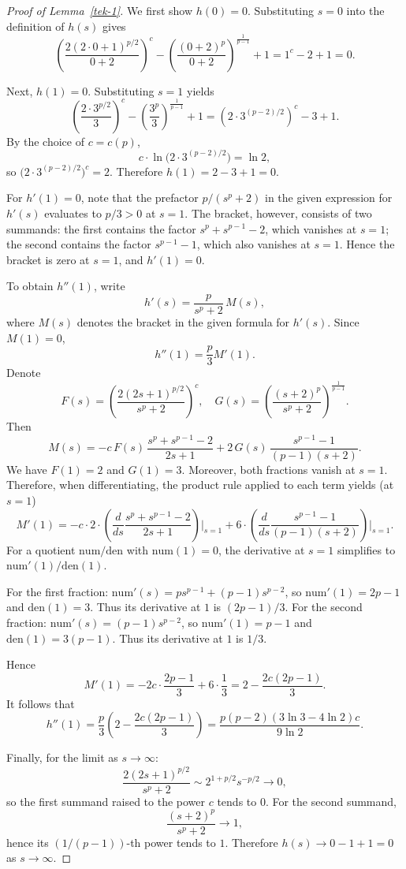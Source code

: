 \documentclass[11pt]{article}
\theoremstyle{definition}
\newcommand{\1}{\mathbf{1}}
\begin{document}
\begin{proof}[Proof of Lemma~\ref{tek-1}]
We first show $h(0)=0$. Substituting $s=0$ into the definition of $h(s)$ gives
\[
\left( \frac{2(2\cdot0+1)^{p/2}}{0+2} \right)^c - \left( \frac{(0+2)^p}{0+2} \right)^{\frac{1}{p-1}} + 1 = 1^c - 2 + 1 = 0.
\]

Next, $h(1)=0$. Substituting $s=1$ yields
\[
\left( \frac{2\cdot3^{p/2}}{3} \right)^c - \left( \frac{3^p}{3} \right)^{\frac{1}{p-1}} + 1 = \left(2 \cdot 3^{(p-2)/2}\right)^c - 3 + 1.
\]
By the choice of $c=c(p)$,
\[
c \cdot \ln\bigl(2 \cdot 3^{(p-2)/2}\bigr) = \ln 2,
\]
so $\bigl(2 \cdot 3^{(p-2)/2}\bigr)^c = 2$. Therefore $h(1) = 2 - 3 + 1 = 0$.

For $h'(1)=0$, note that the prefactor $p/(s^p + 2)$ in the given expression for $h'(s)$ evaluates to $p/3 > 0$ at $s=1$. The bracket, however, consists of two summands: the first contains the factor $s^p + s^{p-1} - 2$, which vanishes at $s=1$; the second contains the factor $s^{p-1} - 1$, which also vanishes at $s=1$. Hence the bracket is zero at $s=1$, and $h'(1)=0$.

To obtain $h''(1)$, write
\[
h'(s) = \frac{p}{s^p + 2} \, M(s),
\]
where $M(s)$ denotes the bracket in the given formula for $h'(s)$. Since $M(1)=0$,
\[
h''(1) = \frac{p}{3} M'(1).
\]
Denote
\[
F(s) = \left( \frac{2(2s+1)^{p/2}}{s^p + 2} \right)^c, \quad G(s) = \left( \frac{(s+2)^p}{s^p + 2} \right)^{\frac{1}{p-1}}.
\]
Then
\[
M(s) = -c \, F(s) \, \frac{s^p + s^{p-1} - 2}{2s + 1} + 2 \, G(s) \, \frac{s^{p-1} - 1}{(p-1)(s+2)}.
\]
We have $F(1)=2$ and $G(1)=3$. Moreover, both fractions vanish at $s=1$. Therefore, when differentiating, the product rule applied to each term yields (at $s=1$)
\[
M'(1) = -c \cdot 2 \cdot \left( \frac{d}{ds} \frac{s^p + s^{p-1} - 2}{2s + 1} \right)\bigg|_{s=1} + 6 \cdot \left( \frac{d}{ds} \frac{s^{p-1} - 1}{(p-1)(s+2)} \right)\bigg|_{s=1}.
\]
For a quotient $\mathrm{num}/\mathrm{den}$ with $\mathrm{num}(1)=0$, the derivative at $s=1$ simplifies to $\mathrm{num}'(1)/\mathrm{den}(1)$.

 For the first fraction: $\mathrm{num}'(s) = p s^{p-1} + (p-1)s^{p-2}$, so $\mathrm{num}'(1) = 2p-1$ and $\mathrm{den}(1)=3$. Thus its derivative at $1$ is $(2p-1)/3$.
 For the second fraction: $\mathrm{num}'(s) = (p-1)s^{p-2}$, so $\mathrm{num}'(1) = p-1$ and $\mathrm{den}(1) = 3(p-1)$. Thus its derivative at $1$ is $1/3$.

Hence
\[
M'(1) = -2c \cdot \frac{2p-1}{3} + 6 \cdot \frac{1}{3} = 2 - \frac{2c(2p-1)}{3}.
\]
It follows that
\[
h''(1) = \frac{p}{3} \left( 2 - \frac{2c(2p-1)}{3} \right) = \frac{p(p-2)(3\ln 3 - 4\ln 2)c}{9\ln 2}.
\]


Finally, for the limit as $s \to \infty$:
\[
\frac{2(2s+1)^{p/2}}{s^p + 2} \sim 2^{1 + p/2} s^{-p/2} \to 0,
\]
so the first summand raised to the power $c$ tends to $0$. For the second summand,
\[
\frac{(s+2)^p}{s^p + 2} \to 1,
\]
hence its $(1/(p-1))$-th power tends to $1$. Therefore $h(s) \to 0 - 1 + 1 = 0$ as $s \to \infty$.
\end{proof}
\end{document}
